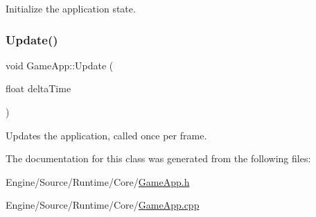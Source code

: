 Initialize the application state. \mbox{\label{class_game_app_af48020622e6db3aa8e55458c3abdff87}} 
\subsubsection{\texorpdfstring{Update()}{Update()}}
{\footnotesize\ttfamily void Game\+App\+::\+Update (\begin{DoxyParamCaption}\item[{float}]{delta\+Time }\end{DoxyParamCaption})\hspace{0.3cm}{\ttfamily [virtual]}}

Updates the application, called once per frame. 

The documentation for this class was generated from the following files\+:\begin{DoxyCompactItemize}
\item 
Engine/\+Source/\+Runtime/\+Core/\mbox{\hyperlink{_game_app_8h}{Game\+App.\+h}}\item 
Engine/\+Source/\+Runtime/\+Core/\mbox{\hyperlink{_game_app_8cpp}{Game\+App.\+cpp}}\end{DoxyCompactItemize}
